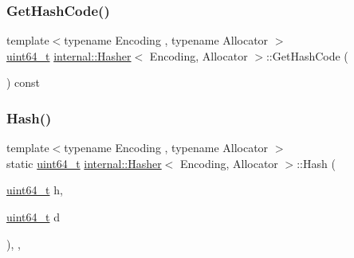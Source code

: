 \mbox{\label{classinternal_1_1Hasher_ac221aaaa0d643aae553125e76aed7b47}} 
\subsubsection{\texorpdfstring{Get\+Hash\+Code()}{GetHashCode()}}
{\footnotesize\ttfamily template$<$typename Encoding , typename Allocator $>$ \\
\hyperlink{stdint_8h_aec6fcb673ff035718c238c8c9d544c47}{uint64\+\_\+t} \hyperlink{classinternal_1_1Hasher}{internal\+::\+Hasher}$<$ Encoding, Allocator $>$\+::Get\+Hash\+Code (\begin{DoxyParamCaption}{ }\end{DoxyParamCaption}) const\hspace{0.3cm}{\ttfamily [inline]}}

\mbox{\label{classinternal_1_1Hasher_ac8c84069bfdefdc503e4446f7adc1e12}} 
\subsubsection{\texorpdfstring{Hash()}{Hash()}}
{\footnotesize\ttfamily template$<$typename Encoding , typename Allocator $>$ \\
static \hyperlink{stdint_8h_aec6fcb673ff035718c238c8c9d544c47}{uint64\+\_\+t} \hyperlink{classinternal_1_1Hasher}{internal\+::\+Hasher}$<$ Encoding, Allocator $>$\+::Hash (\begin{DoxyParamCaption}\item[{\hyperlink{stdint_8h_aec6fcb673ff035718c238c8c9d544c47}{uint64\+\_\+t}}]{h,  }\item[{\hyperlink{stdint_8h_aec6fcb673ff035718c238c8c9d544c47}{uint64\+\_\+t}}]{d }\end{DoxyParamCaption})\hspace{0.3cm}{\ttfamily [inline]}, {\ttfamily [static]}, {\ttfamily [private]}}

\mbox{\label{classinternal_1_1Hasher_aadbadf98ee7c9ab03a636e0f06d38bac}} 
